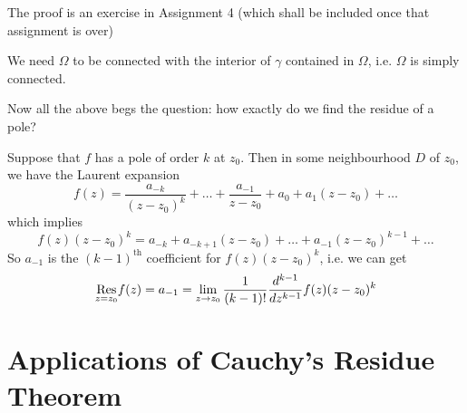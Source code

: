 \documentclass[notoc,notitlepage]{tufte-book}
\begin{document}
The proof is an exercise in Assignment 4 (which shall be included once that assignment is over)

\begin{remark}
  We need $\Omega$ to be connected with the interior of $\gamma$ contained in $\Omega$, i.e. $\Omega$ is simply connected.
\end{remark}

Now all the above begs the question: how exactly do we find the residue of a pole?

Suppose that $f$ has a pole of order $k$ at $z_0$. Then in some neighbourhood $D$ of $z_0$, we have the Laurent expansion
\begin{equation*}
  f(z) = \frac{a_{-k}}{(z - z_0)^k} + \hdots + \frac{a_{-1}}{z - z_0} + a_0 + a_1 (z - z_0) + \hdots  
\end{equation*}
which implies
\begin{equation*}
  f(z) (z - z_0)^k = a_{-k} + a_{-k + 1}(z - z_0) + \hdots + a_{-1}(z - z_0)^{k - 1} + \hdots
\end{equation*}
So $a_{-1}$ is the $(k-1)^{\text{th}}$ coefficient for $f(z) (z - z_0)^k$, i.e. we can get
\begin{equation*}
  \res{f(z)}{z = z_0} = a_{-1} = \lim_{z \to z_0} \frac{1}{(k - 1)!} \frac{d^{k - 1}}{dz^{k -1}} f(z) (z - z_0)^k  
\end{equation*}


\section{Applications of Cauchy's Residue Theorem} %
\label{sec:applications_of_cauchy_s_residue_theorem}
\end{document}
